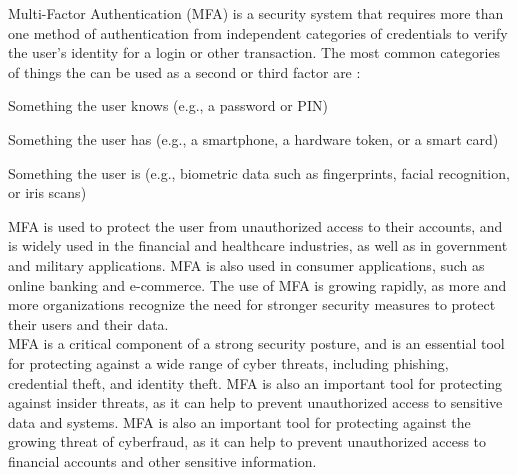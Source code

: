 \documentclass[12pt]{scrbook}
\begin{document}
Multi-Factor Authentication (MFA) is a security system that requires more than
one method of authentication from independent categories of credentials to
verify the user's identity for a login or other transaction. The most common
categories of things the can be used as a second or third factor are \cite{mfa}:
\begin{compactitem}
  \item Something the user knows (e.g., a password or PIN)
  \item Something the user has (e.g., a smartphone, a hardware token, or a smart card)
  \item Something the user is (e.g., biometric data such as fingerprints, facial recognition, or iris scans)
\end{compactitem}

MFA is used to protect the user from unauthorized access to their accounts, and is widely
used in the financial and healthcare industries, as well as in government and
military applications. MFA is also used in consumer applications, such as
online banking and e-commerce. The use of MFA is growing rapidly, as more and
more organizations recognize the need for stronger security measures to
protect their users and their data.\\MFA is a critical component of a
strong security posture, and is an essential tool for protecting against a
wide range of cyber threats, including phishing, credential theft, and
identity theft. MFA is also an important tool for protecting against insider
threats, as it can help to prevent unauthorized access to sensitive data and
systems. MFA is also an important tool for protecting against the growing
threat of cyberfraud, as it can help to prevent unauthorized access to
financial accounts and other sensitive information.
\end{document}
